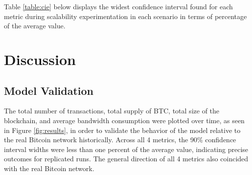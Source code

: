 \documentclass[12pt]{report}
\begin{document}
\begin{table}[]
\centering
\caption{Widest 90\% confidence interval width for each metric represented as a percentage of the average value}
\label{table:civ}
\end{table}

Table \ref{table:cie} below displays the widest confidence interval found for each metric during scalability experimentation in each scenario in terms of percentage of the average value.

\begin{table}[!h]
\centering
\caption{Widest 90\% confidence interval width for each metric and scenario represented as a percentage of the average value}
\label{table:cie}
\end{table}


\section{Discussion}

\subsection{Model Validation}
The total number of transactions, total supply of BTC, total size of the blockchain, and average bandwidth consumption were plotted over time, as seen in Figure \ref{fig:results}, in order to validate the behavior of the model relative to the real Bitcoin network historically. Across all 4 metrics, the 90\% confidence interval widths were less than one percent of the average value, indicating precise outcomes for replicated runs. The general direction of all 4 metrics also coincided with the real Bitcoin network.
\end{document}
